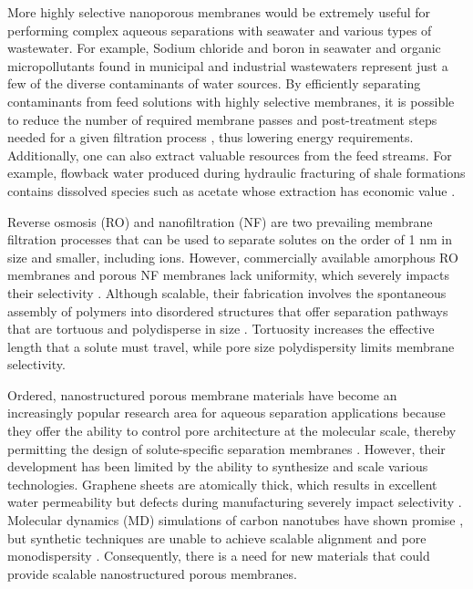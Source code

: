 \documentclass[journal=jpcbfk,manuscript=article]{achemso}
\begin{document}
  More highly selective nanoporous membranes would be extremely useful for
  performing complex aqueous separations with seawater and various types of
  wastewater. For example, Sodium chloride and boron in seawater
  \cite{fritzmann_state---art_2007} and organic micropollutants found in
  municipal and industrial wastewaters \cite{schwarzenbach_challenge_2006}
  represent just a few of the diverse contaminants of water sources. By
  efficiently separating contaminants from feed solutions with highly selective
  membranes, it is possible to reduce the number of required membrane passes and
  post-treatment steps needed for a given filtration process
  \cite{werber_materials_2016}, thus lowering energy requirements. Additionally,
  one can also extract valuable resources from the feed streams. For example,
  flowback water produced during hydraulic fracturing of shale formations
  contains dissolved species such as acetate whose extraction has economic value
  \cite{dischinger_application_2017}.  

  Reverse osmosis (RO) and nanofiltration (NF) are two prevailing membrane
  filtration processes that can be used to separate solutes on the order of 1 nm
  in size and smaller, including ions. However, commercially available amorphous
  RO membranes and porous NF membranes lack uniformity, which severely impacts
  their selectivity \cite{van_der_bruggen_review_2003}. Although scalable, their
  fabrication involves the spontaneous assembly of polymers into disordered
  structures that offer separation pathways that are tortuous and polydisperse in
  size \cite{werber_materials_2016}. Tortuosity increases the effective length
  that a solute must travel, while pore size polydispersity limits membrane
  selectivity.

  Ordered, nanostructured porous membrane materials have become an increasingly popular
  research area for aqueous separation applications because they offer the
  ability to control pore architecture at the molecular scale, thereby
  permitting the design of solute-specific separation membranes
  \cite{humplik_nanostructured_2011}. However, their development has been limited
  by the ability to synthesize and scale various technologies. Graphene sheets
  are atomically thick, which results in excellent water permeability but defects
  during manufacturing severely impact selectivity
  \cite{cohen-tanugi_multilayer_2016}.  Molecular dynamics (MD) simulations of
  carbon nanotubes have shown promise \cite{humplik_nanostructured_2011}, but
  synthetic techniques are unable to achieve scalable alignment and pore
  monodispersity \cite{hata_water-assisted_2004,maruyama_growth_2005}.
  Consequently, there is a need for new materials that could provide scalable
  nanostructured porous membranes. 
\end{document}
